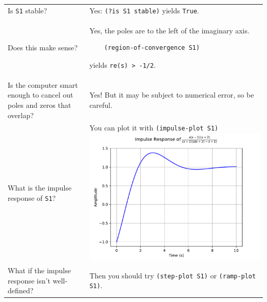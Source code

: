 \documentclass[11pt,letter]{article}
\begin{document}
\begin{longtable}{ p{} p{} }
  Is \lstinline!S1! stable?
  &
  Yes: \lstinline!(?is S1 stable)! yields \lstinline!True!. \\

  Does this make sense?
  &
  Yes, the poles are to the left of the imaginary axis.
  \begin{lstlisting}
    (region-of-convergence S1)
  \end{lstlisting}
  yields \lstinline!re(s) > -1/2!. \\

  Is the computer smart enough to cancel out poles and zeros that overlap?
  &
  Yes! But it may be subject to numerical error, so be careful.\\

  What is the impulse response of \lstinline!S1!?
  &
  You can plot it with \lstinline!(impulse-plot S1)!
  \includegraphics[width=\linewidth]{figs/impulse-feedback} \\

  What if the impulse response isn't well-defined?
  &
  Then you should try \lstinline!(step-plot S1)! or \lstinline!(ramp-plot S1)!. \\


\end{longtable}
\end{document}
